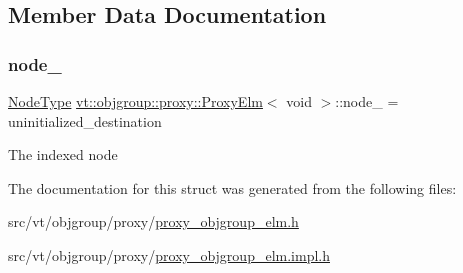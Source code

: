 \subsection{Member Data Documentation}
\mbox{\label{structvt_1_1objgroup_1_1proxy_1_1_proxy_elm_3_01void_01_4_aa09e3bed73c03d683858969775d5d043}} 
\subsubsection{\texorpdfstring{node\+\_\+}{node\_}}
{\footnotesize\ttfamily \hyperlink{namespacevt_a866da9d0efc19c0a1ce79e9e492f47e2}{Node\+Type} \hyperlink{structvt_1_1objgroup_1_1proxy_1_1_proxy_elm}{vt\+::objgroup\+::proxy\+::\+Proxy\+Elm}$<$ void $>$\+::node\+\_\+ = uninitialized\+\_\+destination\hspace{0.3cm}{\ttfamily [private]}}

The indexed node 

The documentation for this struct was generated from the following files\+:\begin{DoxyCompactItemize}
\item 
src/vt/objgroup/proxy/\hyperlink{proxy__objgroup__elm_8h}{proxy\+\_\+objgroup\+\_\+elm.\+h}\item 
src/vt/objgroup/proxy/\hyperlink{proxy__objgroup__elm_8impl_8h}{proxy\+\_\+objgroup\+\_\+elm.\+impl.\+h}\end{DoxyCompactItemize}
